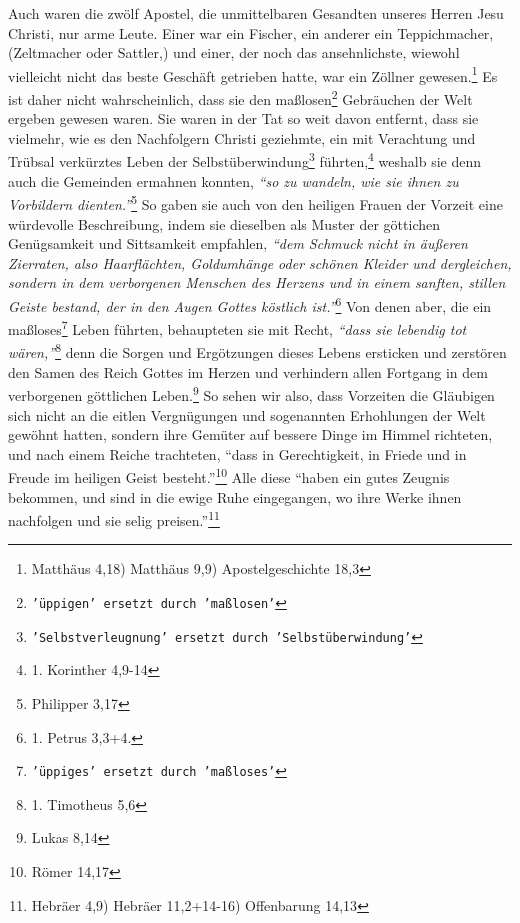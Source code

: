 Auch waren die zwölf Apostel, die unmittelbaren
Gesandten unseres Herren Jesu
Christi, nur arme Leute. Einer war ein Fischer, ein
anderer ein
Teppichmacher,
(Zeltmacher oder Sattler,) und einer, der noch das ansehnlichste, wiewohl
vielleicht nicht das beste Geschäft getrieben hatte, war ein
Zöllner
gewesen.\footnote{Matthäus 4,18) Matthäus 9,9) Apostelgeschichte 18,3}
Es ist daher nicht wahrscheinlich, dass sie den
maßlosen\footnote{\texttt{'üppigen' ersetzt
durch 'maßlosen'}} Gebräuchen der Welt ergeben
gewesen waren. Sie waren in der Tat so weit davon entfernt, dass sie vielmehr,
wie es den Nachfolgern Christi geziehmte, ein mit Verachtung und Trübsal
verkürztes Leben der Selbstüberwindung\footnote{\texttt{'Selbstverleugnung'
ersetzt durch
'Selbstüberwindung'}} führten,\footnote{1. Korinther 4,9-14}
weshalb sie denn auch die Gemeinden ermahnen konnten,
\textit{"`so zu wandeln, wie sie ihnen zu Vorbildern
dienten."'}\footnote{Philipper 3,17}
So gaben sie auch von den heiligen
Frauen der
Vorzeit
eine würdevolle Beschreibung, indem sie dieselben als Muster
der göttichen Genügsamkeit und Sittsamkeit empfahlen,
\textit{"`dem Schmuck nicht in
äußeren Zierraten, also Haarflächten, Goldumhänge oder schönen Kleider und
dergleichen,
sondern in dem verborgenen Menschen des Herzens und in einem sanften, stillen
Geiste bestand, der in den Augen Gottes köstlich ist."'}\footnote{1. Petrus
3,3+4.}
Von denen aber, die ein maßloses\footnote{\texttt{'üppiges' ersetzt durch
'maßloses'}} Leben
führten, behaupteten sie mit Recht,
\textit{"`dass sie lebendig tot wären,"'}\footnote{1.
Timotheus 5,6}
denn die Sorgen und
Ergötzungen dieses Lebens ersticken und zerstören den Samen des Reich
Gottes im
Herzen und verhindern allen Fortgang in dem verborgenen göttlichen
Leben.\footnote{Lukas 8,14}
So sehen wir also, dass Vorzeiten die Gläubigen sich
nicht an die eitlen Vergnügungen und sogenannten Erhohlungen der Welt gewöhnt
hatten, sondern ihre Gemüter auf bessere Dinge im Himmel
richteten, und nach
einem Reiche trachteten,
"`dass in Gerechtigkeit, in Friede und in Freude im
heiligen Geist besteht."'\footnote{Römer 14,17}
Alle diese
"`haben ein gutes
Zeugnis bekommen, und sind in die ewige Ruhe eingegangen, wo ihre Werke ihnen
nachfolgen und sie selig preisen."'\footnote{Hebräer 4,9) Hebräer
11,2+14-16)
Offenbarung 14,13}



